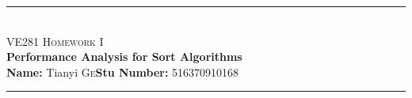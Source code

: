 \newcommand{\HRule}{\rule{\linewidth}{0.5mm}}
{
\center

\HRule \\[0.4cm]
\textsc{\huge VE281 Homework I}\\[0.4cm]
{\Large\textbf{Performance Analysis for Sort Algorithms}}\\[0.4cm]
{\large \textbf{Name:} Tianyi  \textsc{Ge}\quad \textbf{Stu Number:} 516370910168}\\[0.2cm]
\HRule \\[1.5cm]
}